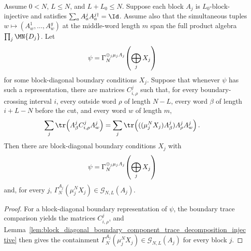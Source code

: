 \begin{lemma}
    \label{lem:block_diagonal_boundary_periodic_components_from_trace_decomposition_boundary}
    \leanok
    Assume $0<N$, $L\le N$, and $L+L_0\le N$. Suppose each block $A_j$
    is $L_0$-block-injective and satisfies
    $\sum_a A^j_aA^{j\dagger}_a=\Id$. Assume also that the simultaneous tuples
    $w\mapsto(A^1_w,\ldots,A^g_w)$ at the middle-word length $m$ span the full
    product algebra $\prod_j\MN{D_j}$. Let
    \begin{align}
        \psi
         & =
        \Gamma_N^{\oplus_j\mu_jA_j}\!\left(\bigoplus_jX_j\right)
        \notag
    \end{align}
    for some block-diagonal boundary conditions $X_j$. Suppose that whenever
    $\psi$ has such a representation, there are matrices $C^j_{i,\rho}$ such
    that, for every boundary-crossing interval $i$, every outside word $\rho$
    of length $N-L$, every word $\beta$ of length $i+L-N$ before the cut, and
    every word $w$ of length $m$,
    \begin{align}
        \sum_j\tr\!\left(A^j_\beta C^j_{i,\rho}A^j_w\right)
         & =
        \sum_j
        \tr\!\left(((\mu_j^NX_j)A^j_\beta)A^j_\rho A^j_w\right).
        \notag
    \end{align}
    Then there are block-diagonal boundary conditions $X_j$ with
    \begin{align}
        \psi
         & =
        \Gamma_N^{\oplus_j\mu_jA_j}\!\left(\bigoplus_jX_j\right)
        \notag
    \end{align}
    and, for every $j$,
    $\Gamma_N^{A_j}(\mu_j^NX_j) \in \mathcal G_{N,L}(A_j)$.
\end{lemma}

\begin{proof}
    \leanok
    For a block-diagonal boundary representation of $\psi$, the boundary trace
    comparison yields the matrices $C^j_{i,\rho}$, and
    Lemma~\ref{lem:block_diagonal_boundary_component_trace_decomposition_injective}
    then gives the containment
    $\Gamma_N^{A_j}(\mu_j^NX_j)\in\mathcal G_{N,L}(A_j)$ for every block $j$.
\end{proof}
